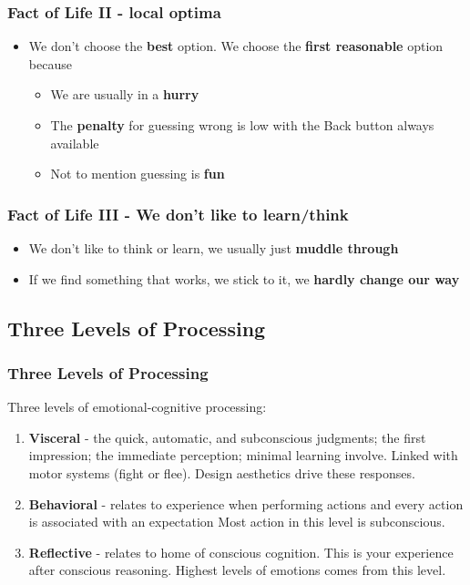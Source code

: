 \documentclass{beamer}
\begin{document}
\begin{frame}
	\frametitle{Fact of Life II - local optima}
	\begin{itemize}
		\item We don't choose the \textbf{best} option.  We choose the \textbf{first reasonable} option because
		\begin{itemize}
			\item We are usually in a \textbf{hurry}
			\item The \textbf{penalty} for guessing wrong is low with the Back button always available
			\item Not to mention guessing is \textbf{fun} 
		\end{itemize} 
	\end{itemize}
\end{frame}

\begin{frame}
	\frametitle{Fact of Life III - We don't like to learn/think}
	\begin{itemize}
		\item We don't like to think or learn, we usually just \textbf{muddle through} 
		\item If we find something that works, we stick to it, we \textbf{hardly change our way}
	\end{itemize}
\end{frame}

\subsection{Three Levels of Processing}

\begin{frame}
\frametitle{Three Levels of Processing}
Three levels of emotional-cognitive processing:
	\begin{enumerate}
		\item \textbf{Visceral} - the quick, automatic, and subconscious judgments; the first impression; the immediate perception; minimal learning involve. Linked with motor systems (fight or flee).  Design aesthetics drive these responses.
		\item \textbf{Behavioral} - relates to experience when performing actions and every action is associated with an expectation  Most action in this level is subconscious.  %
		\item \textbf{Reflective} - relates to home of conscious cognition.  This is your experience after conscious reasoning.  Highest levels of emotions comes from this level.    %
	\end{enumerate}
\end{frame}
\end{document}
